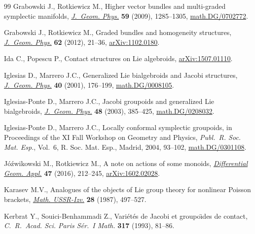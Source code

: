 \documentclass[10pt,a4paper]{amsart}
\numberwithin{equation}{section}
\begin{document}
\begin{thebibliography}{99}
Grabowski J., Rotkiewicz M., Higher vector bundles and multi-graded symplectic
 manifolds, \href{https://doi.org/10.1016/j.geomphys.2009.06.009}{\textit{J.~Geom. Phys.}} \textbf{59} (2009), 1285--1305,
 \href{https://arxiv.org/abs/math.DG/0702772}{math.DG/0702772}.

Grabowski J., Rotkiewicz M., Graded bundles and homogeneity structures,
 \href{https://doi.org/10.1016/j.geomphys.2011.09.004}{\textit{J.~Geom. Phys.}} \textbf{62} (2012), 21--36, \href{https://arxiv.org/abs/1102.0180}{arXiv:1102.0180}.

Ida C., Popescu P., Contact structures on Lie algebroids, \href{https://arxiv.org/abs/1507.01110}{arXiv:1507.01110}.

Iglesias D., Marrero J.C., Generalized {L}ie bialgebroids and {J}acobi
 structures, \href{https://doi.org/10.1016/S0393-0440(01)00032-8}{\textit{J.~Geom. Phys.}} \textbf{40} (2001), 176--199,
 \href{https://arxiv.org/abs/math.DG/0008105}{math.DG/0008105}.

Iglesias-Ponte D., Marrero J.C., Jacobi groupoids and generalized {L}ie
 bialgebroids, \href{https://doi.org/10.1016/S0393-0440(03)00050-0}{\textit{J.~Geom. Phys.}} \textbf{48} (2003), 385--425,
 \href{https://arxiv.org/abs/math.DG/0208032}{math.DG/0208032}.

Iglesias-Ponte D., Marrero J.C., Locally conformal symplectic groupoids, in
 Proceedings of the {XI} {F}all {W}orkshop on {G}eometry and {P}hysics,
 \textit{Publ.~R. Soc. Mat. Esp.}, Vol.~6, R. Soc. Mat. Esp., Madrid, 2004,
 93--102, \href{https://arxiv.org/abs/math.DG/0301108}{math.DG/0301108}.

J\'o\'zwikowski M., Rotkiewicz M., A note on actions of some monoids,
 \href{https://doi.org/10.1016/j.difgeo.2016.04.003}{\textit{Differential Geom. Appl.}} \textbf{47} (2016), 212--245,
 \href{https://arxiv.org/abs/1602.02028}{arXiv:1602.02028}.

Karasev M.V., Analogues of the objects of Lie group theory for nonlinear
 {P}oisson brackets, \href{https://doi.org/10.1070/IM1987v028n03ABEH000895}{\textit{Math. USSR-Izv.}} \textbf{28} (1987), 497--527.

Kerbrat Y., Souici-Benhammadi Z., Vari\'et\'es de {J}acobi et groupo\"\i des de
 contact, \textit{C.~R.~Acad. Sci. Paris S\'er.~I Math.} \textbf{317} (1993),
 81--86.


\end{thebibliography}
\end{document}
